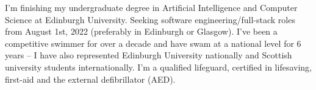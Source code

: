 

\begin{cvparagraph}
    I'm finishing my undergraduate degree in Artificial Intelligence and Computer Science at Edinburgh University. Seeking software engineering/full-stack roles from August 1st, 2022 (preferably in Edinburgh or Glasgow). I've been a competitive swimmer for over a decade and have swam at a national level for 6 years -- I have also represented Edinburgh University nationally and Scottish  university students internationally. I'm a qualified lifeguard, certified in lifesaving, first-aid and the external defibrillator (AED).
\end{cvparagraph}


